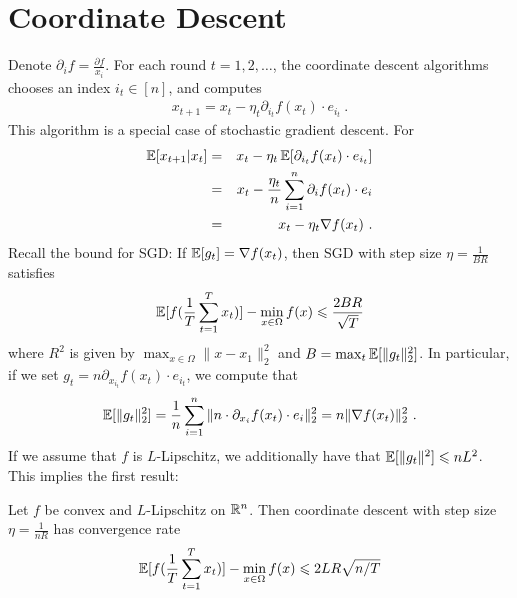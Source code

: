 \section{Coordinate Descent}
  Denote $\partial_i f= \frac{\partial f}{x_i}$.
  For each round $t = 1,2,\dots$, the coordinate descent algorithms
  chooses an index $i_t \in [n]$, and computes
	\begin{eqnarray}
	x_{t+1} = x_t - \eta_t\partial_{i_t}f(x_t) \cdot e_{i_t} \ .
	\end{eqnarray}
  This algorithm is a special case of stochastic gradient descent. For
	\begin{eqnarray}
    \operatorname*{\mathbb{E}}[x_{t+1} | x_t]
    &=& x_t - \eta_t \operatorname*{\mathbb{E}} [\partial_{i_t}f(x_t) \cdot e_{i_t}] \\
    &=& x_t - \frac{\eta_t}{n} \sum_{i=1}^n \partial_{i}f(x_t) \cdot e_i \\
    &=& x_t - \eta_t \nabla f(x_t) \ .
	\end{eqnarray}
	Recall the bound for SGD: If $\operatorname*{\mathbb{E}}[g_t] = \nabla f(x_t)$, then SGD with step size $\eta = \frac{1}{BR}$ satisfies
	\begin{eqnarray}
	\operatorname*{\mathbb{E}}[f(\frac{1}{T}\sum_{t=1}^T x_t)] - \min_{x \in \Omega}f(x) \leqslant \frac{2 BR}{\sqrt{T}}
	\end{eqnarray}
	where $R^2$ is given by $\max_{x \in \Omega} \|x-x_1\|^2_2$ and $B = \max_{t}\operatorname*{\mathbb{E}}[\|g_t\|^2_2]$. In particular, if we set $g_t = n \partial_{x_{i_t}}f(x_t) \cdot e_{i_t}$, we compute that
	\begin{eqnarray}
    \operatorname*{\mathbb{E}}[\|g_t\|^2_2]
    = \frac{1}{n} \sum_{i=1}^n \|n\cdot \partial_{x_{i}}f(x_t) \cdot e_i\|^2_2
    = n \|\nabla f(x_t)\|^2_2 \ .
	\end{eqnarray}
	If we assume that $f$ is $L$-Lipschitz, we additionally have that 
	$\operatorname*{\mathbb{E}}[\|g_t\|^2] \leqslant nL^2$.
  This implies the first result:
	\begin{proposition} Let $f$ be convex and $L$-Lipschitz on $\mathbb{R}^n$.
    Then coordinate descent with step size $\eta = \frac{1}{n R}$ has convergence rate 
	\begin{eqnarray}
	\operatorname*{\mathbb{E}}[f(\frac{1}{T}\sum_{t=1}^T x_t)] - \min_{x \in \Omega}f(x) \leqslant 2LR\sqrt{n/T}
	\end{eqnarray}
	\end{proposition}
